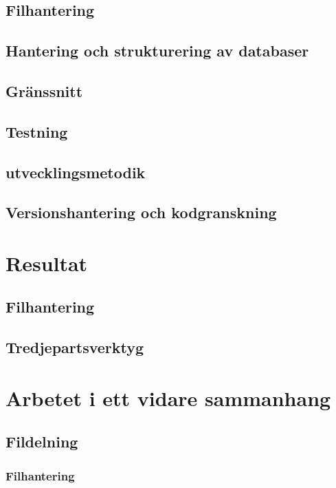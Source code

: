 \documentclass[a4paper,12pt,oneside,final]{extbook}
\begin{document}
\subsection{Filhantering}

\subsection{Hantering och strukturering av databaser}

\subsection{Gränssnitt}

\subsection{Testning}

\subsection{utvecklingsmetodik}

\subsection{Versionshantering och kodgranskning}

\section{Resultat}

\subsection{Filhantering}

\subsection{Tredjepartsverktyg}

\section{Arbetet i ett vidare sammanhang}

\subsection{Fildelning}

\subsubsection{Filhantering}
\end{document}
